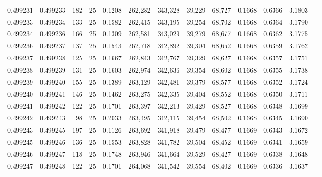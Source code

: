 \begin{tabular}{rrrrrrrrrrrrr}
0.499231 & 0.499233 & 182 &  25 &                                     0.1208 & 262,282 & 343,328 &  39,229 &  68,727 & 0.1668 & 0.6366 & 3.1803 \\
0.499233 & 0.499234 & 133 &  25 &                                     0.1582 & 262,415 & 343,195 &  39,254 &  68,702 & 0.1668 & 0.6364 & 3.1790 \\
0.499234 & 0.499236 & 166 &  25 &                                     0.1309 & 262,581 & 343,029 &  39,279 &  68,677 & 0.1668 & 0.6362 & 3.1775 \\
0.499236 & 0.499237 & 137 &  25 &                                     0.1543 & 262,718 & 342,892 &  39,304 &  68,652 & 0.1668 & 0.6359 & 3.1762 \\
0.499237 & 0.499238 & 125 &  25 &                                     0.1667 & 262,843 & 342,767 &  39,329 &  68,627 & 0.1668 & 0.6357 & 3.1751 \\
0.499238 & 0.499239 & 131 &  25 &                                     0.1603 & 262,974 & 342,636 &  39,354 &  68,602 & 0.1668 & 0.6355 & 3.1738 \\
0.499239 & 0.499240 & 155 &  25 &                                     0.1389 & 263,129 & 342,481 &  39,379 &  68,577 & 0.1668 & 0.6352 & 3.1724 \\
0.499240 & 0.499241 & 146 &  25 &                                     0.1462 & 263,275 & 342,335 &  39,404 &  68,552 & 0.1668 & 0.6350 & 3.1711 \\
0.499241 & 0.499242 & 122 &  25 &                                     0.1701 & 263,397 & 342,213 &  39,429 &  68,527 & 0.1668 & 0.6348 & 3.1699 \\
0.499242 & 0.499243 &  98 &  25 &                                     0.2033 & 263,495 & 342,115 &  39,454 &  68,502 & 0.1668 & 0.6345 & 3.1690 \\
0.499243 & 0.499245 & 197 &  25 &                                     0.1126 & 263,692 & 341,918 &  39,479 &  68,477 & 0.1669 & 0.6343 & 3.1672 \\
0.499245 & 0.499246 & 136 &  25 &                                     0.1553 & 263,828 & 341,782 &  39,504 &  68,452 & 0.1669 & 0.6341 & 3.1659 \\
0.499246 & 0.499247 & 118 &  25 &                                     0.1748 & 263,946 & 341,664 &  39,529 &  68,427 & 0.1669 & 0.6338 & 3.1648 \\
0.499247 & 0.499248 & 122 &  25 &                                     0.1701 & 264,068 & 341,542 &  39,554 &  68,402 & 0.1669 & 0.6336 & 3.1637 \\

\end{tabular}
